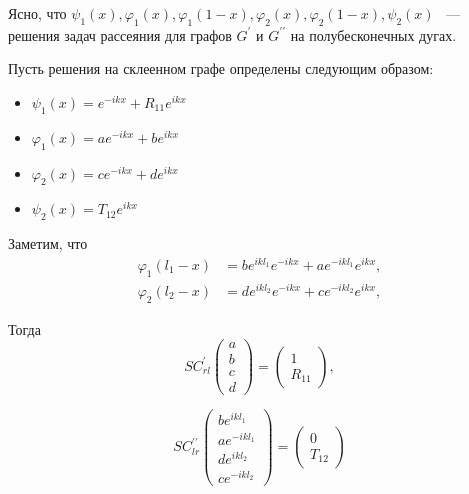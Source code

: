 \documentclass[a4 paper, 12 pt]{extarticle}
\begin{document}
   Ясно, что $\psi_1\left(x\right), \varphi_1\left(x\right), \varphi_1\left(1-x\right), \varphi_2\left(x\right), \varphi_2\left(1-x\right), \psi_2\left(x\right)$ ~--- решения задач рассеяния для графов  $G^\prime$ и $G^{\prime \prime}$ на полубесконечных дугах.
   
   Пусть решения на склеенном графе определены следующим образом:
   \begin{itemize}
   	\item $ \psi_1\left(x\right) = e^{-ikx} + R_{11} e^{ikx} $
   	\item $ \varphi_1\left(x\right)  = a e^{-ikx} + b e^{ikx} $
   	\item $ \varphi_2\left(x\right) = c e^{-ikx} + d e^{ikx} $
   	\item $ \psi_2\left(x\right) = T_{12} e^{ikx}$
   \end{itemize}
    Заметим, что
   \[
   \begin{aligned}
   \varphi_1\left(l_1-x\right) &= b e^{ikl_1} e^{-ikx} + a e^{-ikl_1} e^{ikx}, \\
   \varphi_2\left(l_2-x\right) &= d e^{ikl_2} e^{-ikx} + c e^{-ikl_2} e^{ikx},
   \end{aligned}\]
   
   Тогда
   \begin{equation}
   \label{generalizedBoundaryCond1}
   SC_{rl}^\prime\left(
   \begin{array}{c}
   a \\
   b \\
   c \\
   d
   \end{array}\right) = \left(\begin{array}{c}
   1 \\
   R_{11}
   \end{array}\right),
   \end{equation}
   
   \begin{equation}
   \label{generalizedBoundaryCond2}
   SC_{lr}^{\prime\prime}\left(
   \begin{array}{c}
   b e^{ikl_1} \\
   a e^{-ikl_1}\\
   d e^{ikl_2}\\
   c e^{-ikl_2}
   \end{array}\right) = \left(\begin{array}{c}
   0 \\
   T_{12}
   \end{array}\right)   
   \end{equation}
   
\end{document}
